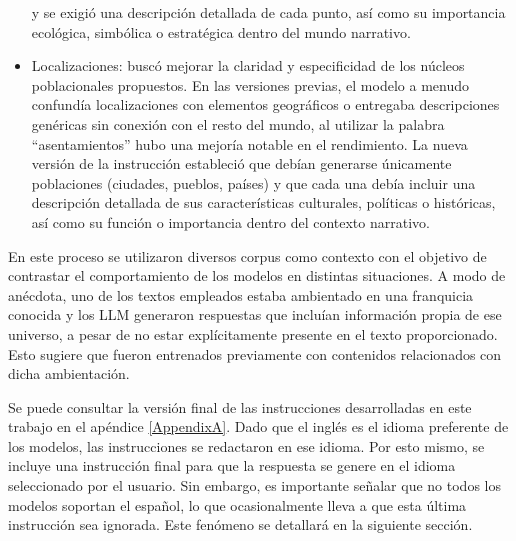 \begin{itemize}
y se exigió una descripción detallada de cada punto, así como su importancia ecológica,
simbólica o estratégica dentro del mundo narrativo.
\item Localizaciones:
buscó mejorar la claridad y especificidad de los núcleos poblacionales propuestos.
En las versiones previas, el modelo a menudo confundía localizaciones con elementos geográficos
o entregaba descripciones genéricas sin conexión con el resto del mundo,
al utilizar la palabra ``asentamientos'' hubo una mejoría notable en el rendimiento.
La nueva versión de la instrucción estableció que debían generarse únicamente poblaciones (ciudades, pueblos, países)
y que cada una debía incluir una descripción detallada de sus características culturales, políticas o históricas,
así como su función o importancia dentro del contexto narrativo.
\end{itemize}

\pagebreak
En este proceso se utilizaron diversos corpus como contexto
con el objetivo de contrastar el comportamiento de los modelos en distintas situaciones.
A modo de anécdota, uno de los textos empleados estaba ambientado en una franquicia conocida
y los LLM generaron respuestas que incluían información propia de ese universo,
a pesar de no estar explícitamente presente en el texto proporcionado.
Esto sugiere que fueron entrenados previamente con contenidos relacionados con dicha ambientación.

Se puede consultar la versión final de las instrucciones desarrolladas en este trabajo en el apéndice \ref{AppendixA}.
Dado que el inglés es el idioma preferente de los modelos,
las instrucciones se redactaron en ese idioma.
Por esto mismo, se incluye una instrucción final para que la respuesta se genere en el idioma seleccionado por el usuario.
Sin embargo, es importante señalar que no todos los modelos soportan el español,
lo que ocasionalmente lleva a que esta última instrucción sea ignorada.
Este fenómeno se detallará en la siguiente sección.